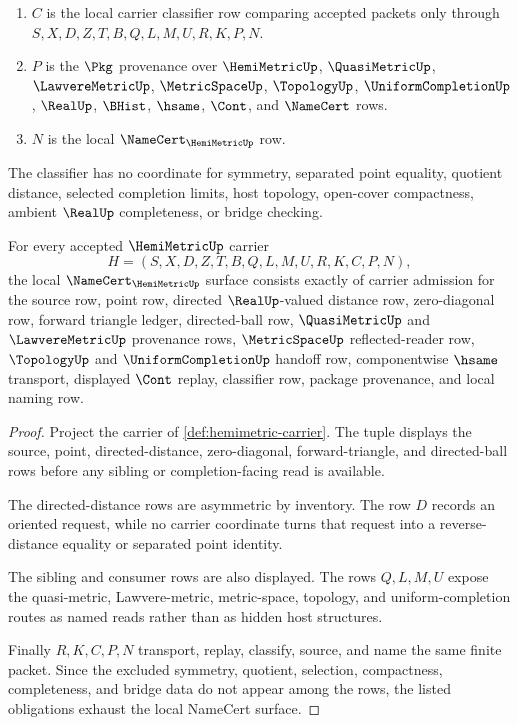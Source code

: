 \begin{definition}
\begin{enumerate}
\item $C$ is the local carrier classifier row comparing accepted packets only through $S,X,D,Z,T,B,Q,L,M,U,R,K,P,N$.
\item $P$ is the $\Pkg$ provenance over $\HemiMetricUp$, $\QuasiMetricUp$, $\LawvereMetricUp$, $\MetricSpaceUp$, $\TopologyUp$, $\UniformCompletionUp$, $\RealUp$, $\BHist$, $\hsame$, $\Cont$, and $\NameCert$ rows.
\item $N$ is the local $\NameCert_{\HemiMetricUp}$ row.
\end{enumerate}
The classifier has no coordinate for symmetry, separated point equality, quotient distance, selected completion limits, host topology, open-cover compactness, ambient $\RealUp$ completeness, or bridge checking.
\end{definition}

\begin{theorem}
\label{thm:hemimetric-namecert-obligations}
For every accepted $\HemiMetricUp$ carrier
$$
H=(S,X,D,Z,T,B,Q,L,M,U,R,K,C,P,N),
$$
the local $\NameCert_{\HemiMetricUp}$ surface consists exactly of carrier admission for the source row, point row, directed $\RealUp$-valued distance row, zero-diagonal row, forward triangle ledger, directed-ball row, $\QuasiMetricUp$ and $\LawvereMetricUp$ provenance rows, $\MetricSpaceUp$ reflected-reader row, $\TopologyUp$ and $\UniformCompletionUp$ handoff row, componentwise $\hsame$ transport, displayed $\Cont$ replay, classifier row, package provenance, and local naming row.
\end{theorem}
\begin{proof}
Project the carrier of \autoref{def:hemimetric-carrier}. The tuple displays the source, point, directed-distance, zero-diagonal, forward-triangle, and directed-ball rows before any sibling or completion-facing read is available.

The directed-distance rows are asymmetric by inventory. The row $D$ records an oriented request, while no carrier coordinate turns that request into a reverse-distance equality or separated point identity.

The sibling and consumer rows are also displayed. The rows $Q,L,M,U$ expose the quasi-metric, Lawvere-metric, metric-space, topology, and uniform-completion routes as named reads rather than as hidden host structures.

Finally $R,K,C,P,N$ transport, replay, classify, source, and name the same finite packet. Since the excluded symmetry, quotient, selection, compactness, completeness, and bridge data do not appear among the rows, the listed obligations exhaust the local NameCert surface.
\end{proof}

